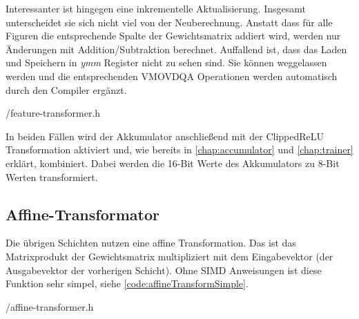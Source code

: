 Interessanter ist hingegen eine inkrementelle Aktualisierung. Insgesamt unterscheidet sie sich nicht viel von der Neuberechnung. Anstatt dass für alle Figuren die entsprechende Spalte der Gewichtsmatrix addiert wird, werden nur Änderungen mit Addition/Subtraktion berechnet. Auffallend ist, dass das Laden und Speichern in \emph{ymm} Register nicht zu sehen sind. Sie können weggelassen werden und die entsprechenden VMOVDQA Operationen werden automatisch durch den Compiler ergänzt.


{\srcloc/feature-transformer.h}

In beiden Fällen wird der Akkumulator anschließend mit der Clipped\ac{ReLU} Transformation aktiviert und, wie bereits in \autoref{chap:accumulator} und \autoref{chap:trainer} erklärt, kombiniert. Dabei werden die 16-Bit Werte des Akkumulators zu 8-Bit Werten transformiert.

% 

\subsection{Affine-Transformator}

Die übrigen Schichten nutzen eine affine Transformation. Das ist das Matrixprodukt der Gewichtsmatrix multipliziert mit dem Eingabevektor (der Ausgabevektor der vorherigen Schicht). Ohne \ac{SIMD} Anweisungen ist diese Funktion sehr simpel, siehe \autoref{code:affineTransformSimple}. 


{\srcloc/affine-transformer.h}

